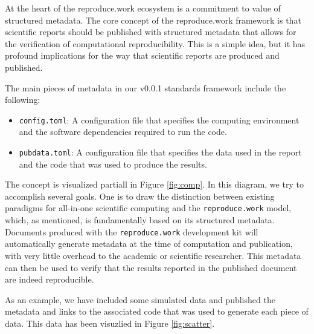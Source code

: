 At the heart of the reproduce.work ecosystem is a commitment to value of structured metadata. The core concept of the reproduce.work framework is that scientific reports should be published with structured metadata that allows for the verification of computational reproducibility. This is a simple idea, but it has profound implications for the way that scientific reports are produced and published.

The main pieces of metadata in our v0.0.1 standards framework include the following:

\begin{itemize}
\itemsep -0.2em
\item \texttt{config.toml}: A configuration file that specifies the computing environment and the software dependencies required to run the code.
\item \texttt{pubdata.toml}: A configuration file that specifies the data used in the report and the code that was used to produce the results.
\end{itemize}

The concept is visualized partiall in Figure \ref{fig:comp}. In this diagram, we try to accomplish several goals. One is to draw the distinction between existing paradigms for all-in-one scientific computing and the \texttt{reproduce.work} model, which, as mentioned, is fundamentally based on its structured metadata. Documents produced with the \texttt{reproduce.work} development kit will automatically generate metadata at the time of computation and publication, with very little overhead to the academic or scientific researcher. This metadata can then be used to verify that the results reported in the published document are indeed reproducible.

As an example, we have included some simulated data and published the metadata and links to the associated code that was used to generate each piece of data. This data has been visuzlied in Figure \ref{fig:scatter}.

